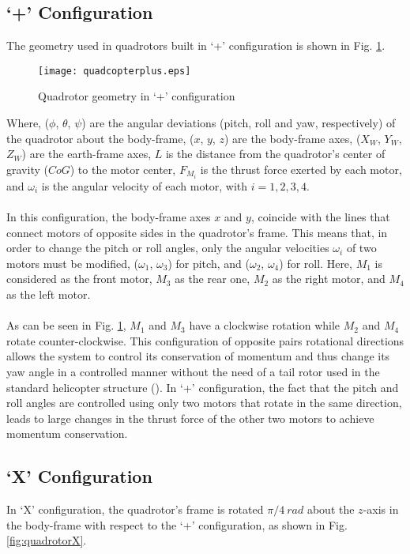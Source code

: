 \subsection{`+' Configuration}
The geometry used in quadrotors built in `+' configuration is shown in Fig. \ref{fig:quadcopterplus}.
\\
\begin{figure}[H]
\begin{center}
  \texttt{[image: quadcopterplus.eps]}
\caption{Quadrotor geometry in `+' configuration} 
    \label{fig:quadcopterplus}
    \end{center}
\end{figure}
Where, ($\phi$, $\theta$, $\psi$) are the angular deviations (pitch, roll and yaw, respectively) of the quadrotor about the body-frame,
 ($x$, $y$, $z$) are the body-frame axes,  ($X_W$, $Y_W$, $Z_W$) are the earth-frame axes, $L$ is the distance from the quadrotor's center of gravity ($CoG$) to the motor center, $F_{M_i}$ is the thrust force exerted by each motor, and $\omega_i$ is the angular velocity of each motor, with $i = 1,2,3,4$. 
\\\\
In this configuration, the body-frame axes $x$ and $y$, coincide with the lines that connect motors of opposite sides in the quadrotor's frame. This means that, in order to change the pitch or roll angles, only the angular velocities $\omega_i$ of two motors must be modified, ($\omega_1$, $\omega_3$) for pitch,  and ($\omega_2$, $\omega_4$) for roll. Here, $M_1$ is considered as the front motor, $M_3$ as the rear one, $M_2$ as the right motor, and $M_4$ as the left motor.
\\\\
As can be seen in Fig. \ref{fig:quadcopterplus}, $M_1$ and $M_3$ have a clockwise rotation while $M_2$ and $M_4$ rotate counter-clockwise. This configuration of opposite pairs rotational directions allows the system to control its conservation of momentum and thus change its yaw angle in a controlled manner without the need of a tail rotor used in the standard helicopter structure (\cite{Bresciani2008}). In `+' configuration, the fact that the pitch and roll angles are controlled using only two motors that rotate in the same direction, leads to large changes in the thrust force of the other two motors to achieve momentum conservation.

\subsection{`X' Configuration}
In `X' configuration, the quadrotor's frame is rotated $\pi/4\ rad$ about the $z$-axis in the body-frame with respect to the `+' configuration, as shown in Fig. \ref{fig:quadrotorX}. 

